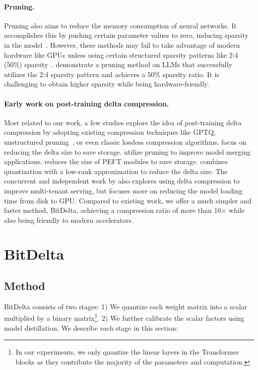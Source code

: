 \documentclass[numbers]{article}
\newcommand{\oursmethod}{BitDelta\xspace}
\begin{document}
\paragraph{Pruning.}
Pruning also aims to reduce the memory consumption of neural networks. It accomplishes this by pushing certain parameter values to zero, inducing sparsity in the model~\citep{lecun1989obd,han2015learning,han2016deep,zhu2017prune}. However, these methods may fail to take advantage of modern hardware like GPUs unless using certain structured sparsity patterns like 2:4 (50\%) sparsity~\citep{mishra2021accelerating}. \citet{frantar2023sparsegpt} demonstrate a pruning method on LLMs that successfully utilizes the 2:4 sparsity pattern and achieves a 50\% sparsity ratio. It is challenging to obtain higher sparsity while being hardware-friendly. 


\paragraph{Early work on post-training delta compression.} Most related to our work, a few studies explore the idea of post-training delta compression by adopting existing compression techniques like GPTQ, unstructured pruning~\citep{han2016deep}, or even classic lossless compression algorithms. \citet{isik2023gptzip} focus on reducing the delta size to save storage. \citet{yu2023language} utilize pruning to improve model merging applications. \citet{yadav2023compeft} reduces the size of PEFT modules to save storage. \citet{ryu2023efficient} combines quantization with a low-rank approximation to reduce the delta size. The concurrent and independent work by \citet{yao2023deltazip} also explores using delta compression to improve multi-tenant serving, but focuses more on reducing the model loading time from disk to GPU. Compared to existing work, we offer a much simpler and faster method, \oursmethod, achieving a compression ratio of more than 10$\times$ while also being friendly to modern accelerators.


\section{\oursmethod}
\subsection{Method}
\label{sec:method}
\oursmethod consists of two stages: 1) We quantize each weight matrix into a scalar multiplied by a binary matrix\footnote{In our experiments, we only quantize the linear layers in the Transformer blocks as they contribute the majority of the parameters and computation.}. 2) We further calibrate the scalar factors using model distillation. We describe each stage in this section:
\end{document}
